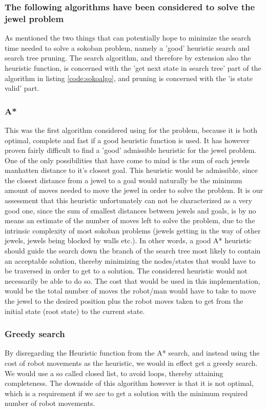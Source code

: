 \subsubsection*{The following algorithms have been considered to solve the jewel problem}
As mentioned the two things that can potentially hope to minimize the search time needed to solve a sokoban problem, namely a 'good' heuristic search and search tree pruning. The search algorithm, and therefore by extension also the heuristic function, is concerned with the 'get next state in search tree' part of the algorithm in listing \ref{code:sokoalgo}, and pruning is concerned with the 'is state valid' part.

\subsubsection*{A*}
This was the first algorithm considered using for the problem, because it is both optimal, complete and fast if a good heuristic function is used.
It has however proven fairly difficult to find a 'good' admissible heuristic for the jewel problem. One of the only possibilities that have come to mind is the sum of each jewels manhatten distance to it's closest goal. This heuristic would be admissible, since the closest distance from a jewel to a goal would naturally be the minimum amount of moves needed to move the jewel in order to solve the problem. It is our assessment that this heuristic unfortunately can not be characterized as a very good one, since the sum of smallest distances between jewels and goals, is by no means an estimate of the number of moves left to solve the problem, due to the intrinsic complexity of most sokoban problems (jewels getting in the way of other jewels, jewels being blocked by walls etc.). In other words, a good A* heuristic should guide the search down the branch of the search tree most likely to contain an acceptable solution, thereby minimizing the nodes/states that would have to be traversed in order to get to a solution. The considered heuristic would not necessarily be able to do so.
The cost that would be used in this implementation, would be the total number of moves the robot/man would have to take to move the jewel to the desired position plus the robot moves taken to get from the initial state (root state) to the current state.

\subsubsection*{Greedy search}
By disregarding the Heuristic function from the A* search, and instead using the cost of robot movements as the heuristic, we would in effect get a greedy search. We would use a so called closed list, to avoid loops, thereby attaining completeness. The downside of this algorithm however is that it is not optimal, which is a requirement if we are to get a solution with the minimum required number of robot movements.

